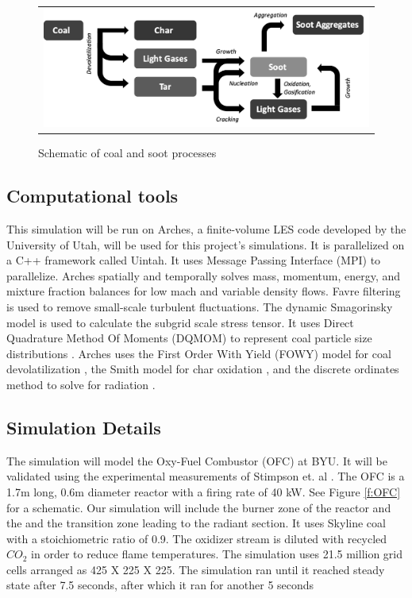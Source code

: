 \documentclass[review,3p]{elsarticle}
\begin{document}
\begin{figure}
\begin{center}
\begin{tabular}{c}
\includegraphics[width=4 in]{../figures/soot_model_Diagram2_bw.png}
\end{tabular}
\caption{Schematic of coal and soot processes}
\label{f:soot}
\end{center}
\end{figure}	

\subsection{Computational tools}
	This simulation will be run on Arches, a finite-volume LES code developed by the University of Utah, will be used for this project's simulations. It is parallelized on a C++ framework called Uintah.  It uses Message Passing Interface (MPI) to parallelize. Arches spatially and temporally solves mass, momentum, energy, and mixture fraction balances for low mach and variable density flows.  Favre filtering is used to remove small-scale turbulent fluctuations.  The dynamic Smagorinsky model is used to calculate the subgrid scale stress tensor.    It uses Direct Quadrature Method Of Moments (DQMOM) to represent coal particle size distributions  \cite{Pedel2012} \cite{Abboud2015} \cite{Marchisio2005}.  Arches uses the First Order With Yield (FOWY) model for coal devolatilization \cite{Schroeder2015}, the Smith model for char oxidation \cite{Smith1980}, and the discrete ordinates method to solve for radiation \cite{Modest2013541}.  


\subsection{Simulation Details}

The simulation will model the Oxy-Fuel Combustor (OFC) at BYU.  It will be validated using the experimental measurements of Stimpson et. al \cite{Stimpson2013}.  The OFC is a 1.7m long, 0.6m diameter reactor with a firing rate of 40 kW.  See Figure \ref{f:OFC} for a schematic.  Our simulation will include the burner zone of the reactor and the and the transition zone leading to the radiant section.  It uses Skyline coal with a stoichiometric ratio of 0.9.  The oxidizer stream is diluted with recycled $CO_2$ in order to reduce flame temperatures.  The simulation uses 21.5 million grid cells arranged as 425 X 225 X 225.  The simulation ran until it reached steady state after 7.5 seconds, after which it ran for another 5 seconds %
\end{document}

